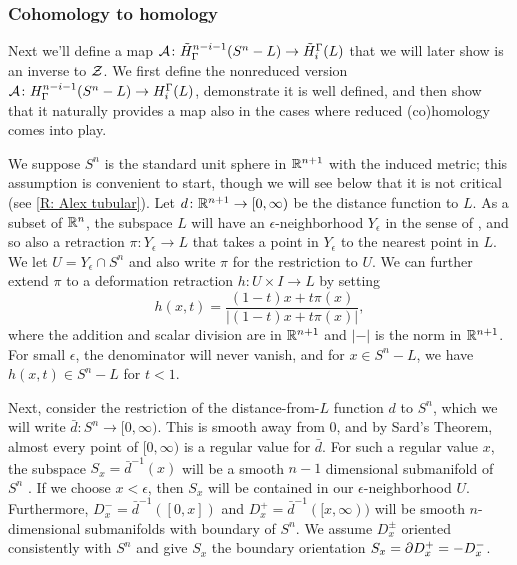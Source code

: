 \subsubsection{Cohomology to homology}
Next we'll define a map $\mathcal{A} \colon \tilde H^{n-i-1}_\Gamma(S^n-L) \to \tilde H_i^\Gamma(L)$ that we will later show is an inverse to $\mathcal{Z}$.
We first define the nonreduced version $\mathcal{A} \colon H^{n-i-1}_\Gamma(S^n-L) \to H_i^\Gamma(L)$, demonstrate it is well defined, and then show that it naturally provides a map also in the cases where reduced (co)homology comes into play.

We suppose $S^n$ is the standard unit sphere in $\mathbb{R}^{n+1}$ with the induced metric; this assumption is convenient to start, though we will see below that it is not critical (see \cref{R: Alex tubular}).
Let $d \colon \mathbb{R}^{n+1} \to [0,\infty)$ be the distance function to $L$.
As a subset of $\mathbb{R}^n$, the subspace $L$ will have an $\epsilon$-neighborhood $Y_\epsilon$ in the sense of \cite[Section 2.3]{GuPo74}, and so also a retraction $\pi \colon Y_\epsilon \to L$ that takes a point in $Y_\epsilon$ to the nearest point in $L$.
We let $U = Y_\epsilon \cap S^n$ and also write $\pi$ for the restriction to $U$.
We can further extend $\pi$ to a deformation retraction $h \colon U \times I \to L$ by setting
\begin{equation}\label{E: alex retraction}
	h(x,t) = \frac{(1-t)x + t\pi(x)}{|(1-t)x + t\pi(x)|},
\end{equation}
where the addition and scalar division are in $\mathbb{R}^{n+1}$ and $|-|$ is the norm in $\mathbb{R}^{n+1}$.
For small $\epsilon$, the denominator will never vanish, and for $x \in S^n -L$, we have $h(x,t) \in S^n -L$ for $t < 1$.

Next, consider the restriction of the distance-from-$L$ function $d$ to $S^n$, which we will write $\bar d \colon S^n \to [0,\infty)$.
This is smooth away from $0$, and by Sard's Theorem, almost every point of $[0,\infty)$ is a regular value for $\bar d$.
For such a regular value $x$, the subspace $S_x = \bar d^{-1}(x)$ will be a smooth $n-1$ dimensional submanifold of $S^n$ \cite[Section 2.1]{GuPo74}.
If we choose $x < \epsilon$, then $S_x$ will be contained in our $\epsilon$-neighborhood $U$.
Furthermore, $D_x^- = \bar d^{-1}([0,x])$ and $D_x^+ = \bar d^{-1}([x,\infty))$ will be smooth $n$-dimensional submanifolds with boundary of $S^n$.
We assume $D^{\pm}_x$ oriented consistently with $S^n$ and give $S_x$ the boundary orientation $S_x = \partial D_x^+ = -D_x^-$.


